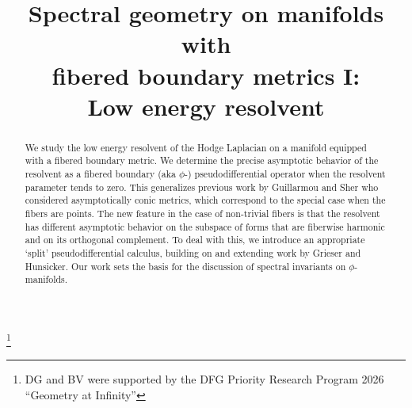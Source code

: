 \documentclass[JEP,XML,SOM,Unicode,NoFloatCountersInSection,published]{cedram}
\theoremstyle{plain}
\theoremstyle{definition}
\begin{document}
\frontmatter

\title[Resolvent at low energy]{Spectral geometry on manifolds with\\ fibered boundary metrics I:\\ Low energy resolvent}

\author[\initial{D.} \lastname{Grieser}]{ }
\address{Institut für Mathematik, Carl von Ossietzky Universität Oldenburg\\
D-26111 Oldenburg, Germany}

\author[\initial{M.} \lastname{Talebi}]{ }
\address{Institut für Mathematik, Carl von Ossietzky Universität Oldenburg\\
D-26111 Oldenburg, Germany}
\urladdr{}

\author[\initial{B.} \lastname{Vertman}]{ }
\address{Institut für Mathematik, Carl von Ossietzky Universität Oldenburg\\
D-26111 Oldenburg, Germany}

\thanks{DG and BV were supported by the DFG Priority Research Program 2026 ``Geometry at Infinity''}


\begin{abstract}
We study the low energy resolvent of the Hodge Laplacian on a manifold equipped with a fibered boundary metric. We determine the precise asymptotic behavior of the resolvent as a fibered boundary (aka $\phi$-) pseudodifferential operator when the resolvent parameter tends to zero.
This generalizes previous work by Guillarmou and Sher who considered asymptotically conic metrics, which correspond to the special case when the fibers are points. The new feature in the case of non-trivial fibers is that the resolvent has different asymptotic behavior on the subspace of forms that are fiberwise harmonic and on its orthogonal complement. To deal with this, we introduce an appropriate `split' pseudodifferential calculus, building on and extending work by Grieser and Hunsicker. Our work sets the basis for the discussion of spectral invariants on $\phi$-manifolds.
\end{abstract}

\end{document}
